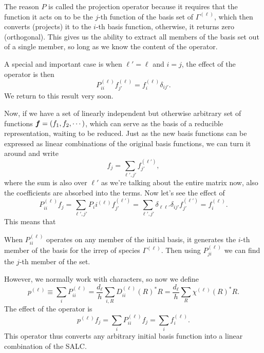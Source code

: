 The reason $P$ is called the projection operator because it requires that the 
function it acts on to be the $j$-th function of the basis set of 
$\Gamma^{(\ell)}$, which then converts (projects) it to the $i$-th basis function, 
otherwise, it returns zero (orthogonal). This gives us the ability to extract all 
members of the basis set out of a single member, so long as we know the content 
of the operator. \par
A special and important case is when $\ell'=\ell$ and $i=j$, the effect of the operator is then
\begin{equation}
P_{ii}^{(\ell)}f_{j'}^{(\ell)}=f_i^{(\ell)}\delta_{ij'}.
\end{equation}
We return to this result very soon.\par
Now, if we have a set of linearly independent but otherwise arbitrary set of 
functions $\boldsymbol{f}=(f_1,f_2,\cdots)$, which can serve as the basis of a reducible 
representation, waiting to be reduced. Just as the new basis functions can be 
expressed as linear combinations of the original basis functions, we can turn it 
around and write
\begin{equation}
f_j=\sum_{\ell',j'}f_{j'}^{(\ell')}, 
\end{equation}
where the sum is also over $\ell'$ as we're talking about the entire matrix now, 
also the coefficients are absorbed into the terms. Now let's see the effect of
\begin{equation}
P_{ii}^{(\ell)}f_j=\sum_{\ell',j'}P_ii^{(\ell)}f_{j'}^{(\ell')}=\sum_{\ell',j'}\delta_{\ell\ell'}\delta_{ij'}f_{j'}^{(\ell')}=f_i^{(\ell)}.
\end{equation}
This means that
\begin{prt}
When $P_{ii}^{(\ell)}$ operates on any member of the initial basis, it generates 
the $i$-th member of the basis for the irrep of species $\Gamma^{(\ell)}$. 
Then using $P_{ji}^{(\ell)}$ we can find the $j$-th member of the set. 
\end{prt}
However, we normally work with characters, so now we define
\begin{equation}
p^{(\ell)}\equiv\sum_iP_{ii}^{(\ell)}=\frac{d_{\ell}}{h}\sum_{i,R}D_{ii}^{(\ell)}(R)^*R=\frac{d_{\ell}}{h}\sum_R\chi^{(\ell)}(R)^*R.
\end{equation}
The effect of the operator is 
\begin{equation}
p^{(\ell)}f_j=\sum_iP_{ii}^{(\ell)}f_j=\sum_if_i^{(\ell)}.
\end{equation}
This operator thus converts any arbitrary initial basis function into a linear 
combination of the SALC.
